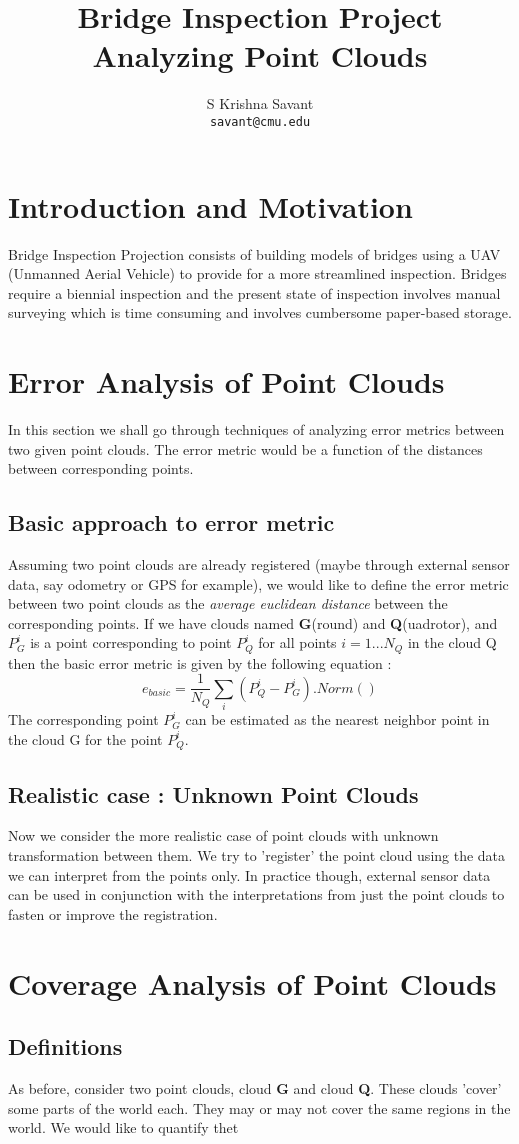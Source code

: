 \documentclass[notitlepage]{article}
\title{Bridge Inspection Project\\[1cm]\textbf{Analyzing Point Clouds}\\[1cm]}
\author{S Krishna Savant\\
        \texttt{savant@cmu.edu}\\
        }
\begin{document}
\maketitle

\tableofcontents

\pagebreak

\section{Introduction and Motivation}
Bridge Inspection Projection consists of building models of bridges using a UAV (Unmanned Aerial Vehicle) to provide for a more streamlined inspection. 
Bridges require a biennial inspection and the present state of inspection involves manual surveying which is time consuming and involves cumbersome paper-based storage.

\section{Error Analysis of Point Clouds}
    In this section we shall go through techniques of analyzing error metrics between two given point clouds.
    The error metric would be a function of the distances between corresponding points.

    \subsection{Basic approach to error metric}
    Assuming two point clouds are already registered (maybe through external sensor data, say odometry or GPS for example), we would like to define the error metric between two point clouds as the \emph{average euclidean distance} between the corresponding points.
    If we have clouds named \textbf{G}(round) and \textbf{Q}(uadrotor), and $P_{G}^{i}$ is a point corresponding to point $P_Q^i$ for all points $i=1...N_Q$ in the cloud Q then the basic error metric is given by the following equation :
    $$ e_{basic} = \frac{1}{N_Q} \sum_{i} (P_Q^{i}-P_G^i).Norm()$$
    The corresponding point $P_G^i$ can be estimated as the nearest neighbor point in the cloud G for the point $P_Q^i$.

    \subsection{Realistic case : Unknown Point Clouds}
    Now we consider the more realistic case of point clouds with unknown transformation between them.
    We try to 'register' the point cloud using the data we can interpret from the points only.
    In practice though, external sensor data can be used in conjunction with the interpretations from just the point clouds to fasten or improve the registration.

\section{Coverage Analysis of Point Clouds}
    \subsection{Definitions}
    As before, consider two point clouds, cloud \textbf{G} and cloud \textbf{Q}. These clouds 'cover' some parts of the world each. They may or may not cover the same regions in the world. We would like to quantify thet
\end{document}
